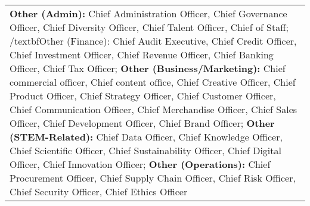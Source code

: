 \begin{table}[htbp]
\begin{tabular}{l*{3}{c}}
\multicolumn{4}{l}{\footnotesize \textbf{Other (Admin):} Chief Administration Officer, Chief Governance Officer, Chief Diversity Officer, Chief Talent Officer, Chief of Staff; /textbf{Other (Finance):} Chief Audit Executive, Chief Credit Officer, Chief Investment Officer, Chief Revenue Officer, Chief Banking Officer, Chief Tax Officer; \textbf{Other (Business/Marketing):} Chief commercial officer, Chief content office, Chief Creative Officer, Chief Product Officer, Chief Strategy Officer, Chief Customer Officer, Chief Communication Officer, Chief Merchandise Officer, Chief Sales Officer, Chief Development Officer, Chief Brand Officer; \textbf{Other (STEM-Related): } Chief Data Officer, Chief Knowledge Officer, Chief Scientific Officer, Chief Sustainability Officer, Chief Digital Officer, Chief Innovation Officer; \textbf{Other (Operations): } Chief Procurement Officer, Chief Supply Chain Officer, Chief Risk Officer, Chief Security Officer, Chief Ethics Officer}\\
\end{tabular}
\end{table}
